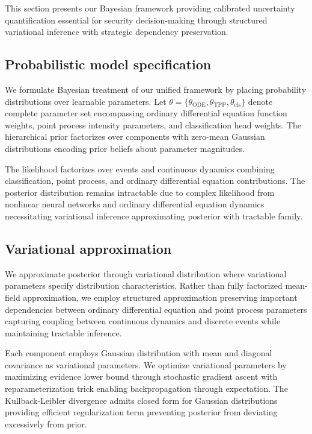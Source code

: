 \documentclass[10pt,journal,compsoc]{IEEEtran}
\begin{document}
This section presents our Bayesian framework providing calibrated uncertainty quantification essential for security decision-making through structured variational inference with strategic dependency preservation.

\subsection{Probabilistic model specification}

We formulate Bayesian treatment of our unified framework by placing probability distributions over learnable parameters. Let $\theta = \{\theta_{\text{ODE}}, \theta_{\text{TPP}}, \theta_{\text{cls}}\}$ denote complete parameter set encompassing ordinary differential equation function weights, point process intensity parameters, and classification head weights. The hierarchical prior factorizes over components with zero-mean Gaussian distributions encoding prior beliefs about parameter magnitudes.

The likelihood factorizes over events and continuous dynamics combining classification, point process, and ordinary differential equation contributions. The posterior distribution remains intractable due to complex likelihood from nonlinear neural networks and ordinary differential equation dynamics necessitating variational inference approximating posterior with tractable family.

\subsection{Variational approximation}

We approximate posterior through variational distribution where variational parameters specify distribution characteristics. Rather than fully factorized mean-field approximation, we employ structured approximation preserving important dependencies between ordinary differential equation and point process parameters capturing coupling between continuous dynamics and discrete events while maintaining tractable inference.

Each component employs Gaussian distribution with mean and diagonal covariance as variational parameters. We optimize variational parameters by maximizing evidence lower bound through stochastic gradient ascent with reparameterization trick enabling backpropagation through expectation. The Kullback-Leibler divergence admits closed form for Gaussian distributions providing efficient regularization term preventing posterior from deviating excessively from prior.
\end{document}
